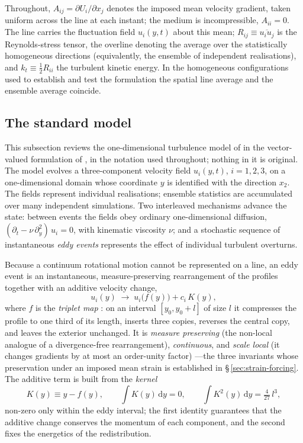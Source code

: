 \documentclass[lineno]{JFM-FLM_Au}
\begin{document}
Throughout, $A_{ij}=\partial U_i/\partial x_j$ denotes the imposed mean
velocity gradient, taken uniform across the line at each instant; the
medium is incompressible, $A_{ii}=0$. The line carries the fluctuation
field $u_i(y,t)$ about this mean; $R_{ij}\equiv\overline{u_iu_j}$ is the
Reynolds-stress tensor, the overline denoting the average over the
statistically homogeneous directions (equivalently, the ensemble of
independent realisations), and $k_t\equiv\tfrac12R_{ii}$ the turbulent
kinetic energy. In the homogeneous configurations used to establish and
test the formulation the spatial line average and the ensemble average
coincide.

\subsection{The standard model}\label{sec:odt-review}

This subsection reviews the one-dimensional turbulence model of
\citet{Kerstein1999} in the vector-valued formulation of
\citet{Kerstein2001}, in the notation used throughout; nothing in it is
original. The model evolves a three-component velocity field $u_i(y,t)$,
$i=1,2,3$, on a one-dimensional domain whose coordinate $y$ is identified
with the direction $x_2$. The fields represent individual realisations;
ensemble statistics are accumulated over many independent simulations.
Two interleaved mechanisms advance the state: between events the fields
obey ordinary one-dimensional diffusion,
$(\partial_t-\nu\,\partial_y^2)\,u_i=0$, with kinematic viscosity $\nu$;
and a stochastic sequence of instantaneous \emph{eddy events} represents
the effect of individual turbulent overturns.

Because a continuum rotational motion cannot be represented on a line, an
eddy event is an instantaneous, measure-preserving rearrangement of the
profiles together with an additive velocity change,
\begin{equation}
  u_i(y)\;\longrightarrow\;u_i\!\big(f(y)\big)+c_i\,K(y),
  \label{eq:event}
\end{equation}
where $f$ is the \emph{triplet map}
\citep{Kerstein1991,Kerstein1999}: on an interval $[y_0,y_0+l]$ of size
$l$ it compresses the profile to one third of its length, inserts three
copies, reverses the central copy, and leaves the exterior unchanged.
It is \emph{measure preserving} (the non-local analogue of a
divergence-free rearrangement), \emph{continuous}, and \emph{scale
local} (it changes gradients by at most an order-unity factor)
\citep{Kerstein2001}---the
three invariants whose preservation under an imposed mean strain is
established in \S\,\ref{sec:strain-forcing}. The additive term is built
from the \emph{kernel}
\begin{equation}
  K(y)\equiv y-f(y),
  \qquad
  \int K(y)\,\mathrm{d}y = 0,
  \qquad
  \int K^2(y)\,\mathrm{d}y = \tfrac{4}{27}\,l^{3},
  \label{eq:kernel-identities}
\end{equation}
non-zero only within the eddy interval; the first identity guarantees
that the additive change conserves the momentum of each component, and
the second fixes the energetics of the redistribution.
\end{document}

